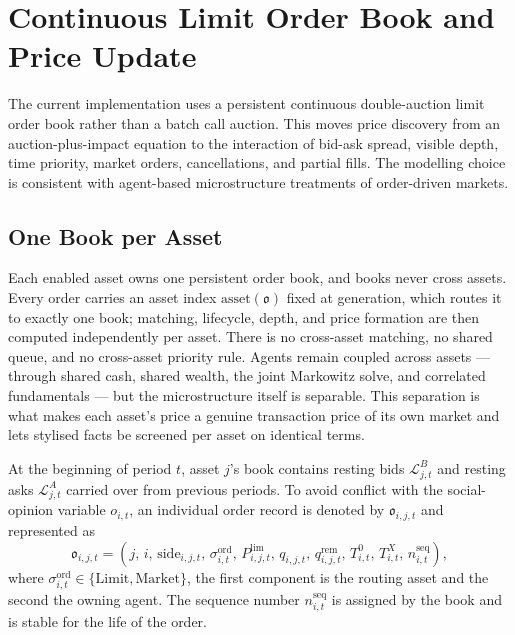 \documentclass[12pt, a4paper]{article}
\begin{document}
    \section{Continuous Limit Order Book and Price Update}\label{sec:continuous_lob}

    The current implementation uses a persistent continuous double-auction limit
    order book rather than a batch call auction. This moves price discovery from an
    auction-plus-impact equation to the interaction of bid-ask spread, visible
    depth, time priority, market orders, cancellations, and partial fills. The
    modelling choice is consistent with agent-based microstructure treatments of
    order-driven markets.

    \subsection{One Book per Asset}

    Each enabled asset owns one persistent order book, and books never cross
    assets. Every order carries an asset index \(\mathrm{asset}(\mathfrak{o})\)
    fixed at generation, which routes it to exactly one book; matching, lifecycle,
    depth, and price formation are then computed independently per asset. There is
    no cross-asset matching, no shared queue, and no cross-asset priority rule.
    Agents remain coupled across assets --- through shared cash, shared wealth,
    the joint Markowitz solve, and correlated fundamentals --- but the
    microstructure itself is separable. This separation is what makes each asset's
    price a genuine transaction price of its own market and lets stylised facts be
    screened per asset on identical terms.

    At the beginning of period \(t\), asset \(j\)'s book contains resting bids
    \(\mathcal{L}_{j,t}^{B}\) and resting asks \(\mathcal{L}_{j,t}^{A}\) carried
    over from previous periods. To avoid conflict with the social-opinion variable
    \(o_{i,t}\), an individual order record is denoted by \(\mathfrak{o}_{i,j,t}\)
    and represented as
    \[
        \mathfrak{o}_{i,j,t}=
        \left(
            j,\,
            i,\,
            \mathrm{side}_{i,j,t},\,
            \sigma_{i,t}^{\mathrm{ord}},\,
            P_{i,j,t}^{\text{lim}},\,
            q_{i,j,t},\,
            q_{i,j,t}^{\mathrm{rem}},\,
            T_{i,t}^{0},\,
            T_{i,t}^{X},\,
            n_{i,t}^{\mathrm{seq}}
        \right),
    \]
    where \(\sigma_{i,t}^{\mathrm{ord}}\in\{\mathrm{Limit},\mathrm{Market}\}\), the
    first component is the routing asset and the second the owning agent. The
    sequence number \(n_{i,t}^{\mathrm{seq}}\) is assigned by the book and is
    stable for the life of the order.
\end{document}
